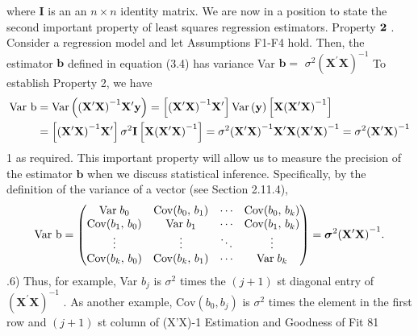 \documentclass[11pt]{article}
\begin{document}
where \(\textbf{I}\) is an an \(n \times n\) identity matrix. We are now in a position to state the
second important property of least squares regression estimators.
Property \({\bf2}\) . Consider a regression model and let Assumptions F1-F4 hold.
Then, the estimator \(\textbf{b}\) defined in equation (3.4) has variance Var \(\mathbf{b}=\)
\(\sigma^{2} {( \mathbf{X}^{\prime} \mathbf{X} )}^{-1}\)
To establish Property 2, we have
\[
\begin{aligned} {\mathrm{V a r ~ b}} & {{}=\mathrm{V a r} \left( {{( {\bf X}^{\prime} {\bf X} )}^{-1}} {\bf X}^{\prime} {\bf y} \right)=\left[ {( {\bf X}^{\prime} {\bf X} )}^{-1} {\bf X}^{\prime} \right] \mathrm{V a r} \left( {\bf y} \right) \left[ {\bf X} {{( {\bf X}^{\prime} {\bf X} )}^{-1}} \right]} \\ {} & {{}=\left[ {{( {\bf X}^{\prime} {\bf X} )}^{-1}} {\bf X}^{\prime} \right] \sigma^{2} {\bf I} \left[ {\bf X} {{( {\bf X}^{\prime} {\bf X} )}^{-1}} \right]=\sigma^{2} {{( {\bf X}^{\prime} {\bf X} )}^{-1}} {\bf X}^{\prime} {{\bf X} ( {{\bf X}^{\prime} {\bf X} )}^{-1}}=\sigma^{2} {( {\bf X}^{\prime} {\bf X} )}^{-1}} \\ \end{aligned}
\]
1
 as required. This important property will allow us to measure the precision of the
estimator \(\mathbf{b}\) when we discuss statistical inference. Specifically, by the definition
 of the variance of a vector (see Section 2.11.4),
\[
\mathrm{V a r ~ b}=\left( \begin{matrix} {\mathrm{V a r} \; b_{0}} & {\mathrm{C o v} ( b_{0} , \, b_{1} )} & {\cdots} & {\mathrm{C o v} ( b_{0} , \, b_{k} )} \\ {\mathrm{C o v} ( b_{1} , \, b_{0} )} & {\mathrm{V a r} \; b_{1}} & {\cdots} & {\mathrm{C o v} ( b_{1} , \, b_{k} )} \\ {\vdots} & {\vdots} & {\ddots} & {\vdots} \\ {\mathrm{C o v} ( b_{k} , \, b_{0} )} & {\mathrm{C o v} ( b_{k} , \, b_{1} )} & {\cdots} & {\mathrm{V a r} \; b_{k}} \\ \end{matrix} \right)={\boldsymbol\sigma}^{2} {( {\bf X}^{\prime} {\bf X} )}^{-1} .
\]
.6)
Thus, for example, Var \(b_{j}\) is \(\sigma^{2}\) times the \(( j+1 )\) st diagonal entry of \(\left( \mathbf{X}^{\prime} \mathbf{X} \right)^{-1}\) .
As another example, \(\mathrm{C o v} ( b_{0} , b_{j} )\) is \(\sigma^{2}\) times the element in the first row and
\(( j+1 )\) st column of (X'X)-1
 Estimation and Goodness of Fit 81
\end{document}
